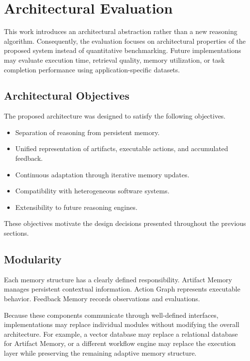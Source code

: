 \section{Architectural Evaluation}
\label{sec:evaluation}

This work introduces an architectural abstraction rather than a new reasoning algorithm. Consequently, the evaluation focuses on architectural properties of the proposed system instead of quantitative benchmarking. Future implementations may evaluate execution time, retrieval quality, memory utilization, or task completion performance using application-specific datasets.

\subsection{Architectural Objectives}

The proposed architecture was designed to satisfy the following objectives.

\begin{itemize}
\item Separation of reasoning from persistent memory.
\item Unified representation of artifacts, executable actions, and accumulated feedback.
\item Continuous adaptation through iterative memory updates.
\item Compatibility with heterogeneous software systems.
\item Extensibility to future reasoning engines.
\end{itemize}

These objectives motivate the design decisions presented throughout the previous sections.

\subsection{Modularity}

Each memory structure has a clearly defined responsibility. Artifact Memory manages persistent contextual information. Action Graph represents executable behavior. Feedback Memory records observations and evaluations.

Because these components communicate through well-defined interfaces, implementations may replace individual modules without modifying the overall architecture. For example, a vector database may replace a relational database for Artifact Memory, or a different workflow engine may replace the execution layer while preserving the remaining adaptive memory structure.

